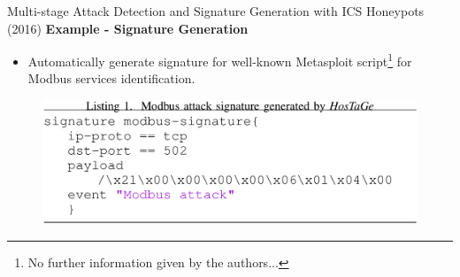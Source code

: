 \documentclass[compress]{beamer}
\begin{document}
\begin{frame}{Multi-stage Attack Detection and Signature Generation with ICS Honeypots (2016)}
    \textbf{Example - Signature Generation}
    \begin{itemize}
     \item Automatically generate signature for well-known Metasploit script\footnote{No further information given by the authors...} for Modbus services identification.
    \end{itemize}
    \begin{figure}
    \centering
    \includegraphics[width=1.0\textwidth]{./images/hostage-signature.png}
    \label{fig:hostage-signature}
    \end{figure}
\end{frame}
\end{document}
